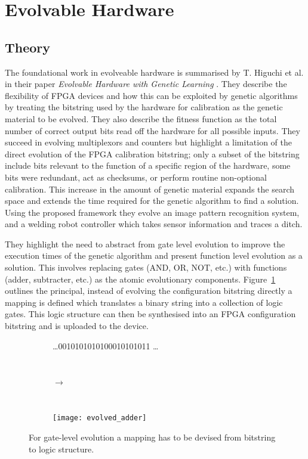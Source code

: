 \section{Evolvable Hardware}

\subsection{Theory}
The foundational work in evolveable hardware is summarised by T. Higuchi et al. in their
paper {\em Evolvable Hardware with Genetic Learning} \cite{541893}. They describe
the flexibility of FPGA devices and how this can be exploited by genetic algorithms
by treating the bitstring used by the hardware for calibration as the genetic material
to be evolved. They also describe the fitness function as the total number of correct
output bits read off the hardware for all possible inputs. They succeed in evolving multiplexors and
counters but highlight a limitation of the direct evolution of the FPGA calibration
bitstring; only a subset of the bitstring include bits relevant to the function
of a specific region of the hardware, some bits were redundant, act as checksums, or
perform routine non-optional calibration. This increase in the amount of genetic
material expands the search space and extends the time required for the genetic algorithm to find a solution.
Using the proposed framework they evolve an image pattern recognition system,
and a welding robot controller which takes sensor information and traces a ditch.

They highlight the need to abstract from gate level evolution to improve the
execution times of the genetic algorithm and present function level evolution
as a solution. This involves replacing gates (AND, OR, NOT, etc.) with functions
(adder, subtracter, etc.) as the atomic evolutionary components. Figure~\ref{fig:mapping}
outlines the principal, instead of evolving the configuration bitstring directly
a mapping is defined which translates a binary string into a collection of
logic gates. This logic structure can then be synthesised into an FPGA configuration
bitstring and is uploaded to the device.

\begin{figure}
	\centering
	\begin{subfigure}[ht]{0.4\textwidth}
		\centering
		\ldots 0010101010100010101011 \ldots
	\end{subfigure}
	~
	\begin{subfigure}[ht]{0.1\textwidth}
		$\rightarrow$
	\end{subfigure}
	~
	\begin{subfigure}[ht]{0.4\textwidth}
		\texttt{[image: evolved\_adder]}
	\end{subfigure}
	\caption{For gate-level evolution a mapping has to be devised from bitstring to logic structure.}
	\label{fig:mapping}
\end{figure}

